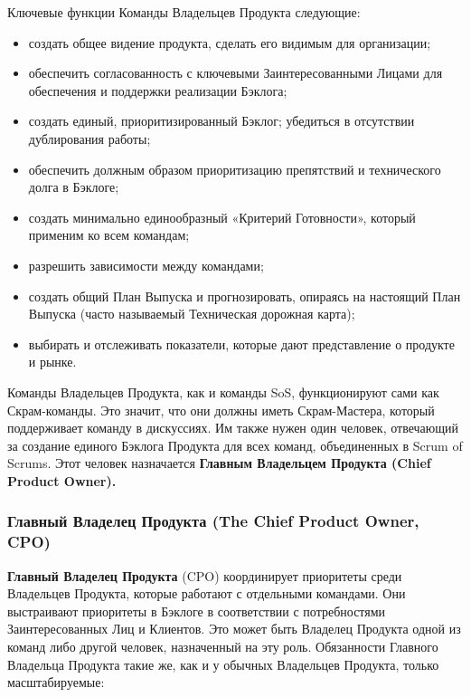 \documentclass[12pt,a4paper,parskip=full]{scrartcl}
\begin{document}
Ключевые функции Команды Владельцев Продукта следующие: 

\begin{itemize}
	\item создать общее видение продукта, сделать его видимым для организации;
	\item обеспечить согласованность с ключевыми Заинтересованными Лицами для обеспечения и поддержки реализации Бэклога;
	\item создать единый, приоритизированный Бэклог; убедиться в отсутствии дублирования работы; 
	\item обеспечить должным образом приоритизацию препятствий и технического долга  в Бэклоге; 
	\item создать минимально единообразный «Критерий Готовности», который применим ко всем командам; 
	\item разрешить зависимости между командами;
	\item создать общий План Выпуска и прогнозировать, опираясь на настоящий План Выпуска (часто называемый Техническая дорожная карта);
	\item выбирать и отслеживать показатели, которые дают представление о продукте и рынке.
\end{itemize}

Команды Владельцев Продукта, как и команды SoS, функционируют сами как Скрам-команды. Это значит, что они должны иметь Скрам-Мастера, который поддерживает команду в дискуссиях. Им также нужен один человек, отвечающий за создание единого Бэклога Продукта для всех команд, объединенных в Scrum of Scrums. Этот человек  назначается  \textbf{Главным Владельцем Продукта (Chief Product Owner).}

\subsubsection{Главный Владелец Продукта (The Chief Product Owner, CPO)}

 \textbf{Главный Владелец Продукта} (CPO) координирует приоритеты среди Владельцев Продукта, которые работают с отдельными командами. Они выстраивают приоритеты в Бэклоге в соответствии с потребностями Заинтересованных Лиц и Клиентов. Это может быть Владелец Продукта одной из команд либо другой человек, назначенный на эту роль. Обязанности Главного Владельца Продукта такие же, как и у обычных Владельцев Продукта, только масштабируемые:
\end{document}
